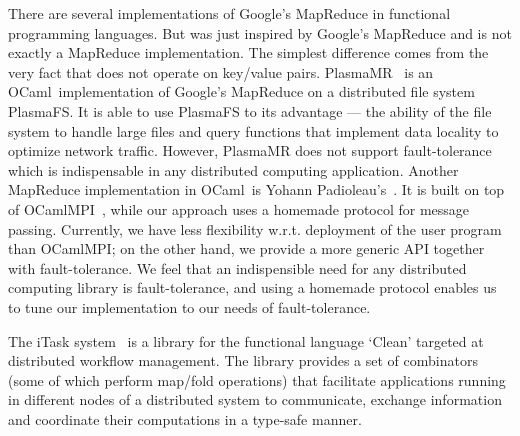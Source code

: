 \documentclass{llncs}
\newcommand{\Ocaml}{OCaml}
\begin{document}
There are several implementations of Google's MapReduce in functional
programming languages. But  was just inspired by Google's
MapReduce and is not exactly a MapReduce implementation. The
simplest difference comes from the very fact that  does not
operate on key/value pairs. 
PlasmaMR~\cite{plasma} is an \Ocaml\ implementation of Google's
MapReduce on a distributed file system PlasmaFS. It is able to use
PlasmaFS to its advantage --- the ability of the file system to handle
large files and query functions that implement data locality to
optimize network traffic. However, PlasmaMR does not support 
fault-tolerance which is indispensable in any distributed computing
application.
Another MapReduce
implementation in \Ocaml\ is Yohann
Padioleau's~\cite{poor-man-mapreduce}.  It is built on
top of OCamlMPI~\cite{ocamlMPI}, while our approach uses a homemade
protocol for message passing. Currently, we have less flexibility
w.r.t. deployment of the user program than OCamlMPI; on the other
hand, we provide a more generic API together with fault-tolerance. We
feel that an indispensible need for any distributed computing library
is fault-tolerance, and using a homemade protocol enables us to
tune our implementation to our needs of fault-tolerance.

The iTask system~\cite{iTask} is a library for the functional language
`Clean' targeted at distributed workflow management. The library
provides a set of combinators (some of which perform map/fold
operations) that facilitate applications running in different nodes
of a distributed system to communicate, exchange information and
coordinate their computations in a type-safe manner.
\end{document}
